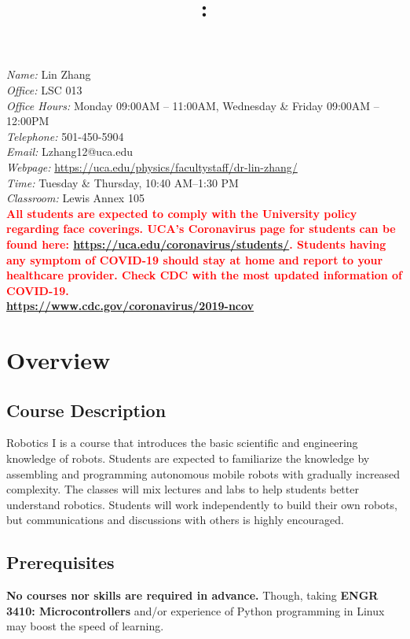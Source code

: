\documentclass[11pt,letterpaper]{article}
\title{\Large\bfseries \coursecode: \coursetitle \\[0.1cm] \semester}
\author{}
\date{}
\makeatletter
\newcommand{\lefthead}[2]{\noindent{\large\textbf{#1}\hfill\\[#2]}}
\newcommand{\instructor}{Lin Zhang}
\newcommand{\office}{LSC 013}
\newcommand{\email}{Lzhang12@uca.edu}
\newcommand{\officehours}{Monday 09:00AM -- 11:00AM, Wednesday \& Friday 09:00AM -- 12:00PM}
\newcommand{\classroom}{Lewis Annex 105}
\newcommand{\classtime}{Tuesday \& Thursday, 10:40 AM--1:30 PM}
\newcommand{\telephone}{501-450-5904}
\newcommand{\webpage}{\href{https://uca.edu/physics/facultystaff/dr-lin-zhang/}{https://uca.edu/physics/facultystaff/dr-lin-zhang/}}
\makeatother
\begin{document}
\maketitle
\thispagestyle{empty}
\vspace{-2cm}


\lefthead{Instructor}{0.3cm}
\indent \emph{Name:} \instructor \\
\indent \emph{Office:} \office \\
\indent \emph{Office Hours:} \officehours \\
\indent \emph{Telephone:} \telephone \\
\indent \emph{Email:} \email \\
\indent \emph{Webpage:} \webpage \\

\lefthead{Class \& Lab}{0.3cm}
\indent \emph{Time:} \classtime \\
\indent \emph{Classroom:} \classroom \\[0.3cm]


\noindent \textbf{\textcolor{red}{All students are expected to comply with the University policy regarding face coverings. UCA’s Coronavirus page for students can be found here: \href{https://uca.edu/coronavirus/students/}{https://uca.edu/coronavirus/students/}. Students having any symptom of COVID-19 should stay at home and report to your healthcare provider. Check CDC with the most updated information of COVID-19. \\\href{https://www.cdc.gov/coronavirus/2019-ncov}{https://www.cdc.gov/coronavirus/2019-ncov}}} 

\section*{Overview}
\subsection*{Course Description}
Robotics I is a course that introduces the basic scientific and engineering knowledge of robots. Students are expected to familiarize the knowledge by assembling and programming autonomous mobile robots with gradually increased complexity. The classes will mix lectures and labs to help students better understand robotics. Students will work independently to build their own robots, but communications and discussions with others is highly encouraged. 

\subsection*{Prerequisites}
\textbf{No courses nor skills are required in advance.} Though, taking \textbf{ENGR 3410: Microcontrollers} and/or experience of Python programming in Linux may boost the speed of learning. 
\end{document}
